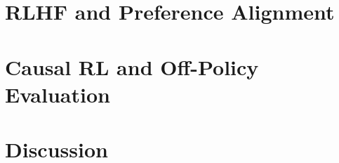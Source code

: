 \section{RLHF and Preference Alignment}\label{section:rlhf}

\section{Causal RL and Off-Policy Evaluation}\label{section:causal}

\section{Discussion}\label{section:conclusion}





